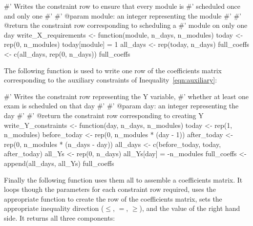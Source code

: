 \begin{Rin-no-test}
#' Writes the constraint row to ensure that every module is
#' scheduled once and only one
#'
#' @param module: an integer representing the module
#'
#' @return the constraint row corresponding to scheduling a
#'         module on only one day
write_X_requirements <- function(module, n_days, n_modules){
  today <- rep(0, n_modules)
  today[module] = 1
  all_days <- rep(today, n_days)
  full_coeffs <- c(all_days, rep(0, n_days))
  full_coeffs
}
\end{Rin-no-test}

The following function is used to write one row of the coefficients matrix
corresponding to the auxiliary constraints of Inequality~\ref{eqn:auxiliary}:

\begin{Rin-no-test}
#' Writes the constraint row representing the Y variable,
#' whether at least one exam is scheduled on that day
#'
#' @param day: an integer representing the day
#'
#' @return the constraint row corresponding to creating Y
write_Y_constraints <- function(day, n_days, n_modules){
  today <- rep(1, n_modules)
  before_today <- rep(0, n_modules * (day - 1))
  after_today <- rep(0, n_modules * (n_days - day))
  all_days <- c(before_today, today, after_today)
  all_Ys <- rep(0, n_days)
  all_Ys[day] = -n_modules
  full_coeffs <- append(all_days, all_Ys)
  full_coeffs
}
\end{Rin-no-test}

Finally the following function uses them all to assemble a coefficients matrix.
It loops though the parameters for each constraint row required, uses the
appropriate function to create the row of the coefficients matrix, sets the
appropriate inequality direction ($\leq$, $=$, $\geq$), and the value of the
right hand side.
It returns all three components:

